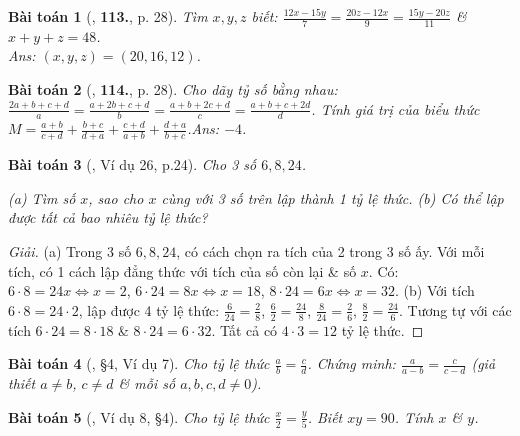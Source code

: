 \documentclass{article}
\newtheorem{baitoan}{Bài toán}
\begin{document}
\begin{baitoan}[\cite{Tuyen_Toan_7}, \textbf{113.}, p. 28]
	Tìm $x,y,z$ biết: $\frac{12x - 15y}{7} = \frac{20z - 12x}{9} = \frac{15y - 20z}{11}$ \& $x + y + z = 48$.\\\mbox{}\hfill{\sf Ans:} $(x,y,z) = (20,16,12)$.
\end{baitoan}

\begin{baitoan}[\cite{Tuyen_Toan_7}, \textbf{114.}, p. 28]
	Cho dãy tỷ số bằng nhau: $\frac{2a + b + c + d}{a} = \frac{a + 2b + c + d}{b} = \frac{a + b + 2c + d}{c} = \frac{a + b + c + 2d}{d}$. Tính giá trị của biểu thức $M = \frac{a + b}{c + d} + \frac{b + c}{d + a} + \frac{c + d}{a + b} + \frac{d + a}{b + c}$.\hfill{\sf Ans:} $-4$.
\end{baitoan}

\begin{baitoan}[\cite{Binh_Toan_7_tap_1}, Ví dụ 26, p.24]
	Cho 3 số $6,8,24$.
	
		(a) Tìm số $x$, sao cho $x$ cùng với 3 số trên lập thành 1 tỷ lệ thức.
		(b) Có thể lập được tất cả bao nhiêu tỷ lệ thức?
	
\end{baitoan}

\begin{proof}[Giải]
	
		(a) Trong 3 số $6,8,24$, có  cách chọn ra tích của 2 trong 3 số ấy. Với mỗi tích, có 1 cách lập đẳng thức với tích của số còn lại \& số $x$. Có: $6\cdot8 = 24x\Leftrightarrow x = 2$, $6\cdot24 = 8x\Leftrightarrow x = 18$, $8\cdot24 = 6x\Leftrightarrow x = 32$.
		(b) Với tích $6\cdot 8 = 24\cdot 2$, lập được 4 tỷ lệ thức: $\frac{6}{24} = \frac{2}{8}$, $\frac{6}{2} = \frac{24}{8}$, $\frac{8}{24} = \frac{2}{6}$, $\frac{8}{2} = \frac{24}{6}$. Tương tự với các tích $6\cdot24 = 8\cdot 18$ \& $8\cdot24 = 6\cdot32$. Tất cả có $4\cdot3 = 12$ tỷ lệ thức.
	
\end{proof}

\begin{baitoan}[\cite{Binh_Toan_7_tap_1}, \S4, Ví dụ 7]
	Cho tỷ lệ thức $\frac{a}{b} = \frac{c}{d}$. Chứng minh: $\frac{a}{a - b} = \frac{c}{c - d}$ (giả thiết $a\ne b$, $c\ne d$ \& mỗi số $a,b,c,d\ne 0$).
\end{baitoan}

\begin{baitoan}[\cite{Binh_Toan_7_tap_1}, Ví dụ 8, \S4]
	Cho tỷ lệ thức $\frac{x}{2} = \frac{y}{5}$. Biết $xy = 90$. Tính $x$ \& $y$.
\end{baitoan}
\end{document}
